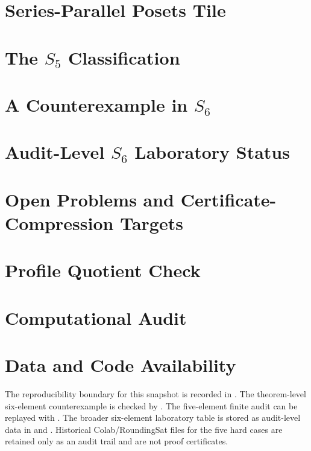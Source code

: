 \documentclass[11pt,a4paper]{article}
\theoremstyle{definition}
\begin{document}
\section{Series-Parallel Posets Tile}


\section{The \texorpdfstring{$S_5$}{S5} Classification}


\section{A Counterexample in \texorpdfstring{$S_6$}{S6}}


\section{Audit-Level \texorpdfstring{$S_6$}{S6} Laboratory Status}


\section{Open Problems and Certificate-Compression Targets}


\appendix
\section{Profile Quotient Check}
\label{app:profile-quotient}


\section{Computational Audit}
\label{app:computational-audit}


\section*{Data and Code Availability}
The reproducibility boundary for this snapshot is recorded in
.  The theorem-level six-element
counterexample is checked by
.  The five-element
finite audit can be replayed with
.  The broader
six-element laboratory table is stored as audit-level data in
 and
.  Historical
Colab/RoundingSat files for the five hard cases are retained only as an
audit trail and are not proof certificates.



\end{document}

